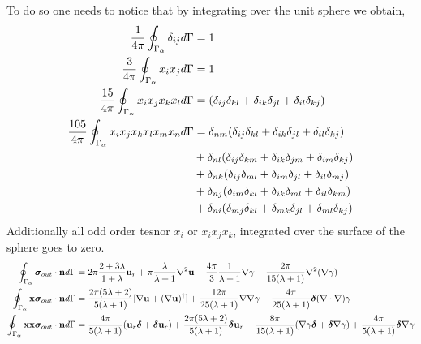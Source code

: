 To do so one needs to notice that by integrating over the unit sphere we obtain, 
\begin{align*}
    \frac{1}{4\pi}\oint_{\Gamma_{\alpha}} \delta_{ij} d\Gamma &=1\\
    \frac{3}{4\pi}\oint_{\Gamma_{\alpha}} x_ix_j d\Gamma &= 1\\
    \frac{15}{4\pi}\oint_{\Gamma_{\alpha}} x_ix_jx_kx_l d\Gamma &= (\delta_{ij}\delta_{kl} + \delta_{ik}\delta_{jl} + \delta_{il}\delta_{kj}) \\
    \frac{105}{4\pi}\oint_{\Gamma_{\alpha}} x_ix_jx_kx_lx_mx_n d\Gamma 
    &= 
    \delta_{nm}(
        \delta_{ij}\delta_{kl} 
        + \delta_{ik}\delta_{jl} 
        + \delta_{il}\delta_{kj}
        ) \\
    &+ 
    \delta_{nl}(
        \delta_{ij}\delta_{km} 
        + \delta_{ik}\delta_{jm} 
        + \delta_{im}\delta_{kj}
        ) \\
    &+ 
    \delta_{nk}(
        \delta_{ij}\delta_{ml} 
        + \delta_{im}\delta_{jl} 
        + \delta_{il}\delta_{mj}
        ) \\
    &+ 
    \delta_{nj}(
        \delta_{im}\delta_{kl} 
        + \delta_{ik}\delta_{ml} 
        + \delta_{il}\delta_{km}
        ) \\
    &+ 
    \delta_{ni}(
        \delta_{mj}\delta_{kl} 
        + \delta_{mk}\delta_{jl} 
        + \delta_{ml}\delta_{kj}
        ) \\
\end{align*}
Additionally all odd order tesnor $x_i$ or $x_ix_jx_k$, integrated over the surface of the sphere goes to zero. 
\begin{align*}
    \oint_{\Gamma_{\alpha}} \bm\sigma_{out}\cdot \textbf{n} d\Gamma &
    =
    2\pi\frac{2+3\lambda}{1+\lambda}\textbf{u}_r
    + \pi \frac{\lambda}{\lambda +1} \mathbf{\nabla}^2 \textbf{u}
    +
    \frac{4\pi}{3}\frac{1}{\lambda +1}\mathbf{\nabla} \gamma
    + \frac{2\pi}{15(\lambda +1)}\mathbf{\nabla}^2(\mathbf{\nabla}\gamma)
    \\
    \oint_{\Gamma_{\alpha}}  \textbf{x}\bm\sigma_{out}\cdot \textbf{n} d\Gamma &
    =
    \frac{2\pi(5\lambda +2)}{5(\lambda +1)}[\mathbf{\nabla} \textbf{u}+ (\mathbf{\nabla} \textbf{u})^\dagger]
    + \frac{12\pi}{25(\lambda +1)}\mathbf{\nabla}\mathbf{\nabla} \gamma
    - \frac{4\pi}{25(\lambda +1)}\bm\delta(\mathbf{\nabla}\cdot\mathbf{\nabla}) \gamma
    \\
    \oint_{\Gamma_{\alpha}} \textbf{xx}\bm\sigma_{out}\cdot \textbf{n} d\Gamma &
    =
    \frac{4\pi}{5(\lambda +1)} (\textbf{u}_r \bm\delta + \bm\delta \textbf{u}_r)
    + \frac{2\pi(5\lambda +2)}{5(\lambda+1)}\bm\delta \textbf{u}_r
    - \frac{8\pi}{15(\lambda +1)} (\mathbf{\nabla} \gamma \bm\delta + \bm\delta \mathbf{\nabla} \gamma)
    + \frac{4\pi}{5(\lambda+1)}\bm\delta \mathbf{\nabla} \gamma
    \\
\end{align*}

